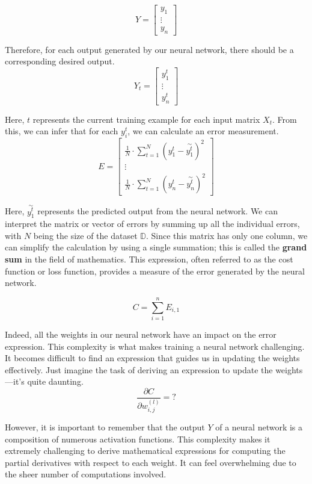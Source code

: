 \[
Y = \begin{bmatrix} y_1 \\ \vdots \\ y_n \end{bmatrix}
\]

Therefore, for each output generated by our neural network, there should be a corresponding desired output.
\[
Y_t = \begin{bmatrix} y_{1}^t \\ \vdots \\ y_{n}^t \end{bmatrix}
\]

Here, $t$ represents the current training example for each input matrix $X_t$.
From this, we can infer that for each $y_{i}^t$, we can calculate an error measurement.
\[
E =
\begin{bmatrix}
  \frac{1}{N} \cdot \sum_{t = 1}^{N}(y^t_{1} - \overset{\sim}{y_{1}^t})^2 \\ \vdots \\
  \frac{1}{N} \cdot \sum_{t = 1}^{N}(y^t_{n} - \overset{\sim}{y_{n}^t})^2
\end{bmatrix}
\]

Here, $\overset{\sim}{y_{1}^t}$ represents the predicted output from the neural network. We can
interpret the matrix or vector of errors by summing up all the individual errors, with $N$ being the
size of the dataset $\mathbb{D}$. Since this matrix has only one column, we can simplify the calculation
by using a single summation; this is called the \textbf{grand sum} in the field of mathematics.
This expression, often referred to as
the cost function or loss function, provides a measure of the error generated by the neural network.

\[
C = \sum_{i = 1}^{n} E_{i, 1}
\]

Indeed, all the weights in our neural network have an impact on the error expression. This complexity is
what makes training a neural network challenging. It becomes difficult to find an expression that guides
us in updating the weights effectively. Just imagine the task of deriving an expression to update the
weights—it's quite daunting.
\[
\frac{\partial C}{\partial w_{i, j}^{(l)}} = ?
\]

However, it is important to remember that the output $Y$ of a neural network is a composition of numerous
activation functions. This complexity makes it extremely challenging to derive mathematical expressions for
computing the partial derivatives with respect to each weight. It can feel overwhelming due to the sheer number
of computations involved.

